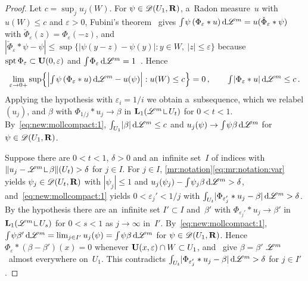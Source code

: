 \documentclass[a4paper,twoside,leqno]{article}
\begin{document}
\begin{proof}
    Let $c = \sup_j u_j(W)$. For $\psi \in \mathscr{D}(U_1,\mathbf{R})$, a~Radon measure~$u$ with $u(W) \le c$
    and $\varepsilon > 0$, Fubini's theorem~\cite[2.6.2]{Federer1969} gives ${\textstyle\int_{}^{}} \psi \,
    (\Phi_\varepsilon * u) \,\mathrm{d} \mathscr{L}^m = u(\check\Phi_\varepsilon * \psi)$ with
    $\check\Phi_\varepsilon(z) = \Phi_\varepsilon(-z)$, and $|\check \Phi_\varepsilon * \psi - \psi|
    \le \sup \{ |\psi(y - z) - \psi(y)| : y \in W,\ |z| \le \varepsilon \}$ because $\operatorname{spt}
    \Phi_\varepsilon \subset \mathbf{U}(0,\varepsilon)$ and ${\textstyle\int_{}^{}} \Phi_\varepsilon \,\mathrm{d} \mathscr{L}^m
    = 1$~\cite[4.1.2]{Federer1969}. Hence
    \begin{equation}
        \label{eq:new:mollcompact:1}
        \lim_{\varepsilon \to 0+} \sup \Bigl\{ \Bigl| {\textstyle\int_{}^{}} \psi \, (\Phi_\varepsilon * u)
        \,\mathrm{d} \mathscr{L}^m - u(\psi) \Bigr| : u(W) \le c \Bigr\} = 0 \,, \qquad {\textstyle\int_{}^{}}
        |\Phi_\varepsilon * u| \,\mathrm{d} \mathscr{L}^m \le c \,.
    \end{equation}
    Applying the hypothesis with $\varepsilon_i = 1/i$ we obtain a~subsequence, which we relabel
    $(u_j)$, and $\beta$ with $\Phi_{1/j} * u_j \to \beta$ in $\Lp{1}(\LM^m \restrict U_t)$ for
    $0 < t < 1$. By~\eqref{eq:new:mollcompact:1}, ${\textstyle\int_{U_1}^{}} |\beta| \,\mathrm{d} \mathscr{L}^m \le c$ and
    $u_j(\psi) \to {\textstyle\int_{}^{}} \psi \beta \,\mathrm{d} \mathscr{L}^m$ for $\psi \in \mathscr{D}(U_1,\mathbf{R})$.

    Suppose there are $0 < t < 1$, $\delta > 0$ and an~infinite set~$I$ of indices with $\|u_j -
    \LM^m \restrict \beta\|(U_t) > \delta$ for $j \in I$. For $j \in I$,
    \ref{mr:notation}\eqref{eq:mr:notation:var} yields $\psi_j \in \mathscr{D}(U_t,\mathbf{R})$ with $|\psi_j|
    \le 1$ and $u_j(\psi_j) - {\textstyle\int_{}^{}} \psi_j \beta \,\mathrm{d} \mathscr{L}^m > \delta$,
    and~\eqref{eq:new:mollcompact:1} yields $0 < \varepsilon_j' < 1/j$ with ${\textstyle\int_{U_t}^{}}
    |\Phi_{\varepsilon_j'} * u_j - \beta| \,\mathrm{d} \mathscr{L}^m > \delta$. By the hypothesis there are
    an~infinite set $I' \subset I$ and~$\beta'$ with $\Phi_{\varepsilon_j'} * u_j \to \beta'$ in
    $\Lp{1}(\LM^m \restrict U_s)$ for $0 < s < 1$ as $j \to \infty$ in~$I'$.
    By~\eqref{eq:new:mollcompact:1}, ${\textstyle\int_{}^{}} \psi \beta' \,\mathrm{d} \mathscr{L}^m = \lim_{j \in I'}
    u_j(\psi) = {\textstyle\int_{}^{}} \psi \beta \,\mathrm{d} \mathscr{L}^m$ for $\psi \in \mathscr{D}(U_1,\mathbf{R})$. Hence
    $\Phi_\varepsilon * (\beta - \beta')(x) = 0$ whenever $\mathbf{U}(x,\varepsilon) \cap W \subset
    U_1$, and~\cite[4.1.2, 2.9.9]{Federer1969} give $\beta = \beta'$ $\mathscr{L}^m$~almost everywhere
    on~$U_1$. This contradicts ${\textstyle\int_{U_t}^{}} |\Phi_{\varepsilon_j'} * u_j - \beta| \,\mathrm{d} \mathscr{L}^m >
    \delta$ for $j \in I'$.
\end{proof}
\end{document}
